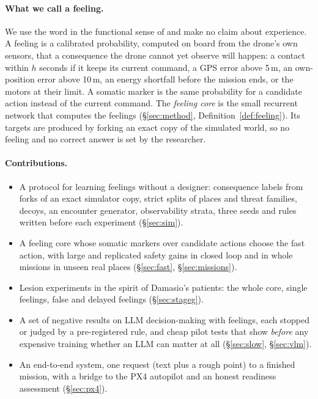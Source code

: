 \documentclass[10pt]{article}
\begin{document}
\paragraph{What we call a feeling.} We use the word in the functional sense of \citet{man2019} and make no claim about experience.
A feeling is a calibrated probability, computed on board from the drone's own sensors, that a consequence the drone cannot yet
observe will happen: a contact within $h$ seconds if it keeps its current command, a GPS error above 5\,m, an own-position error
above 10\,m, an energy shortfall before the mission ends, or the motors at their limit. A somatic marker is the same probability for
a candidate action instead of the current command. The \emph{feeling core} is the small recurrent network that computes the
feelings (\S\ref{sec:method}, Definition~\ref{def:feeling}). Its targets are produced by forking an exact copy of the simulated world,
so no feeling and no correct answer is set by the researcher.

\paragraph{Contributions.}
\begin{itemize}
\item A protocol for learning feelings without a designer: consequence labels from forks of an exact simulator copy, strict
splits of places and threat families, decoys, an encounter generator, observability strata, three seeds and rules written
before each experiment (\S\ref{sec:sim}).
\item A feeling core whose somatic markers over candidate actions choose the fast action, with large and replicated safety gains
in closed loop and in whole missions in unseen real places (\S\ref{sec:fast}, \S\ref{sec:missions}).
\item Lesion experiments in the spirit of Damasio's patients: the whole core, single feelings, false and delayed feelings
(\S\ref{sec:stageg}).
\item A set of negative results on LLM decision-making with feelings, each stopped or judged by a pre-registered rule, and cheap
pilot tests that show \emph{before} any expensive training whether an LLM can matter at all (\S\ref{sec:slow}, \S\ref{sec:vlm}).
\item An end-to-end system, one request (text plus a rough point) to a finished mission, with a bridge to the PX4 autopilot and an
honest readiness assessment (\S\ref{sec:px4}).
\end{itemize}
\end{document}
